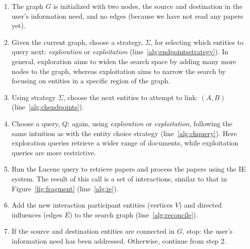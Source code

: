 \begin{enumerate}%
\item The graph $G$ is initialized with two nodes, the source and destination in the user's information need, and no edges (because we have not read any papers yet).
  \item Given the current graph, choose a strategy, $\mathit{\Sigma}$, for selecting which entities to query next: {\em exploration} or {\em exploitation} (line~\ref{alg:endpointsstrategy}). In general, exploration aims to widen the search space by adding many more nodes to the graph, whereas exploitation aims to narrow the search by focusing on entities in a specific region of the graph.
  \item Using strategy $\mathit{\Sigma}$, choose the next entities to attempt to link: $(A,B)$ (line~\ref{alg:chendpoints}). 
  \item Choose a query, $Q$: again, using {\em exploration} or {\em exploitation}, following the same intuition as with the entity choice strategy (line~\ref{alg:chquery}).
Here exploration queries retrieve a wider range of documents, while exploitation queries are more restrictive.
  
  \item Run the Lucene query to retrieve papers and process the papers using the IE system.  The result of this call is a set of interactions, similar to that in Figure~\ref{fig:fragment} (line~\ref{alg:ie}).
  \item Add the new interaction participant entities (vertices $V$) and directed influences (edges $E$) to the search graph (line~\ref{alg:reconcile}).
    \item If the source and destination entities are connected in $G$, stop: the user's information need has been addressed. Otherwise, continue from step 2.
\end{enumerate}

